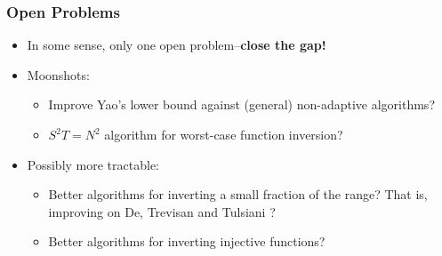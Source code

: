 \documentclass[usenames, dvipsnames, t, table]{beamer}
\begin{document}
      \begin{frame}
        \frametitle{Open Problems}
        \begin{itemize}
        \item In some sense, only one open problem--\pause\textbf{close the gap!}
          \pause
        \item Moonshots:
        \begin{itemize}
         \item Improve Yao's lower bound against (general) non-adaptive algorithms?
          \pause
        \item $S^2 T = N^2$ algorithm for worst-case function inversion?
          \pause
        \end{itemize}
        \item Possibly more tractable:
\begin{itemize}
        \item Better algorithms for inverting a small fraction of the range? That is, improving on De, Trevisan and Tulsiani \cite{DTT10}?
          \pause
        \item Better algorithms for inverting injective functions?
\end{itemize}
        \end{itemize}
      \end{frame}
\end{document}
